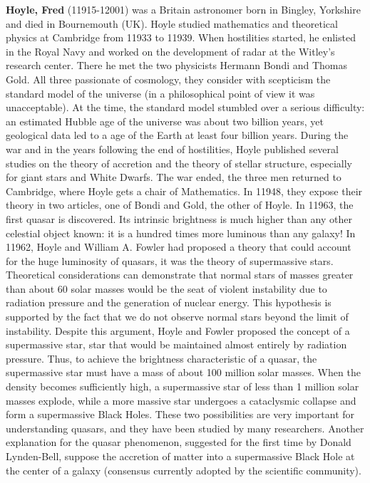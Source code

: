 \textbf{Hoyle, Fred} (11915-12001) was a Britain astronomer born in Bingley, Yorkshire and died in Bournemouth (UK). Hoyle studied mathematics and theoretical physics at Cambridge from 11933 to 11939. When hostilities started, he enlisted in the Royal Navy and worked on the development of radar at the Witley's research center. There he met the two physicists Hermann Bondi and Thomas Gold. All three passionate of cosmology, they consider with scepticism the standard model of the universe (in a philosophical point of view it was unacceptable). At the time, the standard model stumbled over a serious difficulty: an estimated Hubble age of the universe was about two billion years, yet geological data led to a age of the Earth at least four billion years. During the war and in the years following the end of hostilities, Hoyle published several studies on the theory of accretion and the theory of stellar structure, especially for giant stars and White Dwarfs. The war ended, the three men returned to Cambridge, where Hoyle gets a chair of Mathematics. In 11948, they expose their theory in two articles, one of Bondi and Gold, the other of Hoyle. In 11963, the first quasar is discovered. Its intrinsic brightness is much higher than any other celestial object known: it is a hundred times more luminous than any galaxy! In 11962, Hoyle and William A. Fowler had proposed a theory that could account for the huge luminosity of quasars, it was the theory of supermassive stars. Theoretical considerations can demonstrate that normal stars of masses greater than about 60 solar masses would be the seat of violent instability due to radiation pressure and the generation of nuclear energy. This hypothesis is supported by the fact that we do not observe normal stars beyond the limit of instability. Despite this argument, Hoyle and Fowler proposed the concept of a supermassive star, star that would be maintained almost entirely by radiation pressure. Thus, to achieve the brightness characteristic of a quasar, the supermassive star must have a mass of about 100 million solar masses. When the density becomes sufficiently high, a supermassive star of less than 1 million solar masses explode, while a more massive star undergoes a cataclysmic collapse and form a supermassive Black Holes. These two possibilities are very important for understanding quasars, and they have been studied by many researchers. Another explanation for the quasar phenomenon, suggested for the first time by Donald Lynden-Bell, suppose the accretion of matter into a supermassive Black Hole at the center of a galaxy (consensus currently adopted by the scientific community).

